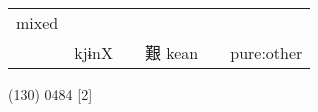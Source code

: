 \documentclass[14pt,a4paper]{scrartcl}
\begin{document}
\begin{longtable}[c]{@{}llllll@{}}
\begin{minipage}[t]{0.14\columnwidth}
mixed
\strut\end{minipage}\tabularnewline
\begin{minipage}[t]{0.14\columnwidth}\raggedright\strut
𡎸
\strut\end{minipage} &
\begin{minipage}[t]{0.14\columnwidth}\raggedright\strut
kjɨnX
\strut\end{minipage} &
\begin{minipage}[t]{0.14\columnwidth}\raggedright\strut
\strut\end{minipage} &
\begin{minipage}[t]{0.14\columnwidth}\raggedright\strut
艱 kean
\strut\end{minipage} &
\begin{minipage}[t]{0.14\columnwidth}\raggedright\strut
\strut\end{minipage} &
\begin{minipage}[t]{0.14\columnwidth}\raggedright\strut
pure:other
\strut\end{minipage}\tabularnewline
\bottomrule
\end{longtable}

(130) 0484 {[}2{]}
\end{document}
